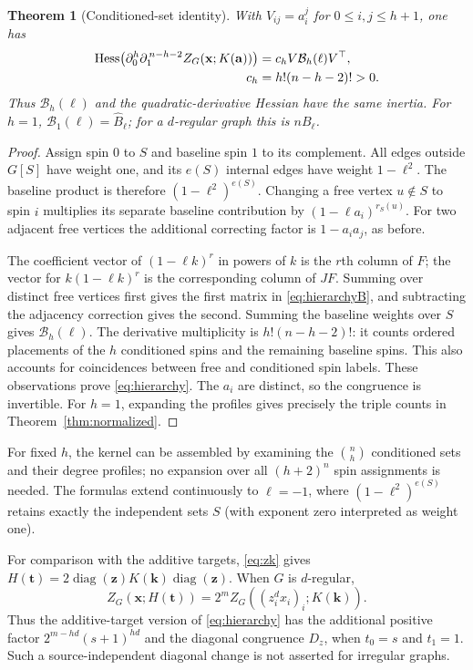 \documentclass[11pt]{article}
\newtheorem{theorem}{Theorem}
\theoremstyle{remark}
\DeclareMathOperator{\Hess}{Hess}
\DeclareMathOperator{\diag}{diag}
\newcommand{\dd}{\partial}
\begin{document}
\begin{theorem}[Conditioned-set identity]\label{thm:hierarchy}
With $V_{ij}=a_i^j$ for $0\leq i,j\leq h+1$, one has
\begin{align}
 \Hess\bigl(\dd_0^h\dd_1^{\,n-h-2}Z_G(\mathbf x;K(\mathbf a))\bigr)
    &=c_h V\mathcal B_h(\ell)V^\top,
                                                        \label{eq:hierarchy}\\
 c_h&=h!(n-h-2)!>0. \notag
\end{align}
Thus $\mathcal B_h(\ell)$ and the quadratic-derivative Hessian have
the same inertia. For $h=1$, $\mathcal B_1(\ell)=\widehat{B}_\ell$;
for a $d$-regular graph this is $nB_\ell$.
\end{theorem}
\begin{proof}
Assign spin $0$ to $S$ and baseline spin $1$ to its complement.
All edges outside $G[S]$ have weight one, and its $e(S)$ internal
edges have weight $1-\ell^2$. The baseline product is therefore
$(1-\ell^2)^{e(S)}$.
Changing a free vertex $u\notin S$ to spin $i$ multiplies its
separate baseline contribution by
$(1-\ell a_i)^{r_S(u)}$.
For two adjacent free vertices the additional correcting factor
is $1-a_i a_j$, as before.

The coefficient vector of $(1-\ell k)^r$ in powers of $k$ is the
$r$th column of $F$; the vector for $k(1-\ell k)^r$ is the
corresponding column of $JF$.
Summing over distinct free vertices first gives the first matrix
in \eqref{eq:hierarchyB}, and subtracting the adjacency correction
gives the second. Summing the baseline weights over $S$ gives
$\mathcal B_h(\ell)$.
The derivative multiplicity is $h!(n-h-2)!$: it counts ordered
placements of the $h$ conditioned spins and the remaining baseline
spins. This also accounts for coincidences between free and
conditioned spin labels. These observations prove
\eqref{eq:hierarchy}.
The $a_i$ are distinct, so the congruence is invertible.
For $h=1$, expanding the profiles gives precisely the triple counts
in Theorem~\ref{thm:normalized}.
\end{proof}

For fixed $h$, the kernel can be assembled by examining the
$\binom nh$ conditioned sets and their degree profiles; no expansion
over all $(h+2)^n$ spin assignments is needed.
The formulas extend continuously to $\ell=-1$, where
$(1-\ell^2)^{e(S)}$ retains exactly the independent sets $S$
(with exponent zero interpreted as weight one).

For comparison with the additive targets, \eqref{eq:zk} gives
$H(\mathbf t)=2\diag(\mathbf z)K(\mathbf k)\diag(\mathbf z)$.
When $G$ is $d$-regular,
\begin{equation}
 Z_G(\mathbf x;H(\mathbf t))
    =2^m Z_G((z_i^d x_i)_i;K(\mathbf k)).              \label{eq:regularscaling}
\end{equation}
Thus the additive-target version of \eqref{eq:hierarchy} has
the additional positive factor $2^{m-hd}(s+1)^{hd}$ and the
diagonal congruence $D_z$, when $t_0=s$ and $t_1=1$.
Such a source-independent diagonal change is not asserted for
irregular graphs.
\end{document}
